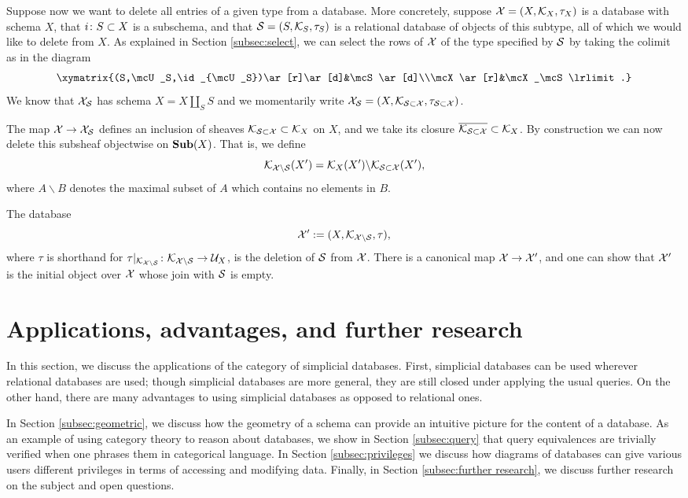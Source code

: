 \documentclass{amsart}
\def\Sub{{\bf Sub}}
\begin{document}
Suppose now we want to delete all entries of a given type from a database.  More concretely, suppose $\mathcal{X}=(X,\mathcal{K}_X,\tau_X)$ is a database with schema $X$, that $i\colon S\subset X$ is a subschema, and that $\mathcal{S}=(S,\mathcal{K}_S,\tau_S)$ is a relational database of objects of this subtype, all of which we would like to delete from $X$.  As explained in Section \ref{subsec:select}, we can select the rows of $\mathcal{X}$ of the type specified by $\mathcal{S}$ by taking the colimit as in the diagram $$\xymatrix{(S,\mcU_S,\id_{\mcU_S})\ar[r]\ar[d]&\mcS\ar[d]\\\mcX\ar[r]&\mcX_\mcS\lrlimit.}$$  We know that $\mathcal{X}_\mathcal{S}$ has schema $X=X\amalg_SS$ and we momentarily write $\mathcal{X}_\mathcal{S}=(X,\mathcal{K}_{\mathcal{S}\subset\mathcal{X}},\tau_{\mathcal{S}\subset\mathcal{X}})$.  

The map $\mathcal{X}\rightarrow\mathcal{X}_\mathcal{S}$ defines an inclusion of sheaves $\mathcal{K}_{\mathcal{S}\subset\mathcal{X}}\subset\mathcal{K}_X$ on $X$, and we take its closure $\overline{\mathcal{K}_{\mathcal{S}\subset\mathcal{X}}}\subset\mathcal{K}_X$.  By construction we can now delete this subsheaf objectwise on $\Sub(X)$.  That is, we define $$\mathcal{K}_{\mathcal{X}\backslash\mathcal{S}}(X')=\mathcal{K}_X(X')\backslash\mathcal{K}_{\mathcal{S}\subset\mathcal{X}}(X'),$$ where $A\backslash B$ denotes the maximal subset of $A$ which contains no elements in $B$.

The database $$\mathcal{X}':=(X,\mathcal{K}_{\mathcal{X}\backslash\mathcal{S}},\tau),$$ where $\tau$ is shorthand for $\tau|_{\mathcal{K}_{\mathcal{X}\backslash\mathcal{S}}}\colon\mathcal{K}_{\mathcal{X}\backslash\mathcal{S}}\rightarrow\mathcal{U}_X$, is the deletion of $\mathcal{S}$ from $\mathcal{X}$.  There is a canonical map $\mathcal{X}\rightarrow\mathcal{X}'$, and one can show that $\mathcal{X}'$ is the initial object over $\mathcal{X}$ whose join with $\mathcal{S}$ is empty.

\section{Applications, advantages, and further research}\label{sec:applications}

In this section, we discuss the applications of the category of simplicial databases.  First, simplicial databases can be used wherever relational databases are used; though simplicial databases are more general, they are still closed under applying the usual queries.  On the other hand, there are many advantages to using simplicial databases as opposed to relational ones.  

In Section \ref{subsec:geometric}, we discuss how the geometry of a schema can provide an intuitive picture for the content of a database.  As an example of using category theory to reason about databases, we show in Section \ref{subsec:query} that query equivalences are trivially verified when one phrases them in categorical language.  In Section \ref{subsec:privileges} we discuss how diagrams of databases can give various users different privileges in terms of accessing and modifying data.  Finally, in Section \ref{subsec:further research}, we discuss further research on the subject and open questions.
\end{document}
